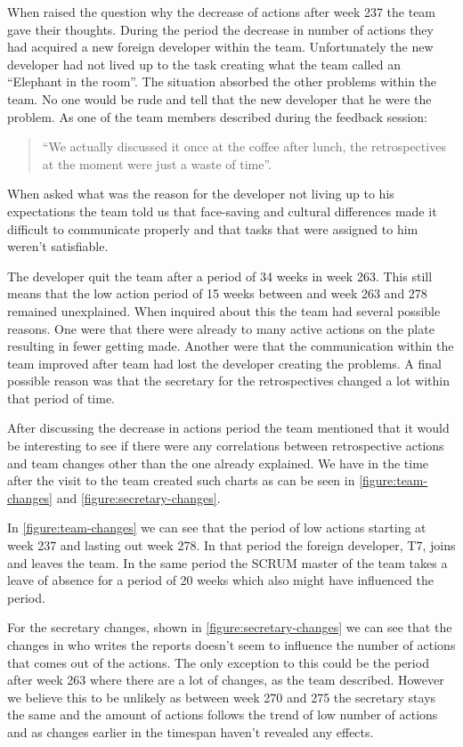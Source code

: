 \label{results-elephant-in-the-room} When raised the question why the decrease of actions after week 237 the team gave their thoughts. During the period the decrease in number of actions they had acquired a new foreign developer within the team. Unfortunately the new developer had not lived up to the task creating what the team called an ``Elephant in the room''. The situation absorbed the other problems within the team. No one would be rude and tell that the new developer that he were the problem. As one of the team members described during the feedback session: 
\begin{quote}
``We actually discussed it once at the coffee after lunch, the retrospectives at the moment were just a waste of time''. 
\end{quote}
When asked what was the reason for the developer not living up to his expectations the team told us that face-saving and cultural differences made it difficult to communicate properly and that tasks that were assigned to him weren't satisfiable. 

The developer quit the team after a period of 34 weeks in week 263. This still means that the low action period of 15 weeks between and week 263 and 278 remained unexplained. When inquired about this the team had several possible reasons. One were that there were already to many active actions on the plate resulting in fewer getting made. Another were that the communication within the team improved after team had lost the developer creating the problems. A final possible reason was that the secretary for the retrospectives changed a lot within that period of time. 

After discussing the decrease in actions period the team mentioned that it would be interesting to see if there were any correlations between retrospective actions and team changes other than the one already explained. We have in the time after the visit to the team created such charts as can be seen in \autoref{figure:team-changes} and \autoref{figure:secretary-changes}. 

In \autoref{figure:team-changes} we can see that the period of low actions starting at week 237 and lasting out week 278. In that period the foreign developer, T7, joins and leaves the team. In the same period the SCRUM master of the team takes a leave of absence for a period of 20 weeks which also might have influenced the period. 

For the secretary changes, shown in \autoref{figure:secretary-changes} we can see that the changes in who writes the reports doesn't seem to influence the number of actions that comes out of the actions. The only exception to this could be the period after week 263 where there are a lot of changes, as the team described. However we believe this to be unlikely as between week 270 and 275 the secretary stays the same and the amount of actions follows the trend of low number of actions and as changes earlier in the timespan haven't revealed any effects. 

